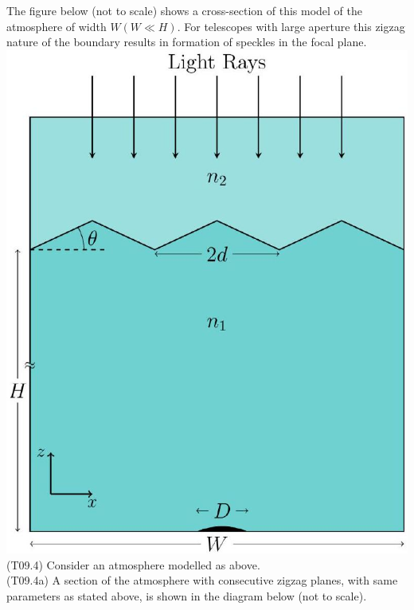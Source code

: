 \documentclass[10pt]{article}
\begin{document}
    The figure below (not to scale) shows a cross-section of this model of the atmosphere of width $W(W \ll H)$. For telescopes with large aperture this zigzag nature of the boundary results in formation of speckles in the focal plane.\\
    \includegraphics[max width=\textwidth, center]{2025_08_23_e94579452776a99c4850g-10}\\
    (T09.4) Consider an atmosphere modelled as above.\\
    (T09.4a) A section of the atmosphere with consecutive zigzag planes, with same parameters as stated above, is shown in the diagram below (not to scale).\\
\end{document}
